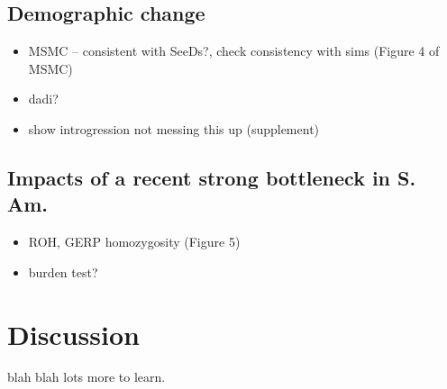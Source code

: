 \documentclass[11pt]{article}
\begin{document}
\subsection*{Demographic change}
\begin{itemize}
\item MSMC -- consistent with SeeDs?, check consistency with sims (Figure 4 of MSMC)
\item dadi?
\item show introgression not messing this up (supplement)
\end{itemize}

\subsection*{Impacts of a recent strong bottleneck in S. Am.}
\begin{itemize}
\item ROH, GERP homozygosity (Figure 5)
\item burden test?
\end{itemize}

\section*{Discussion}

blah blah lots more to learn.
\end{document}
